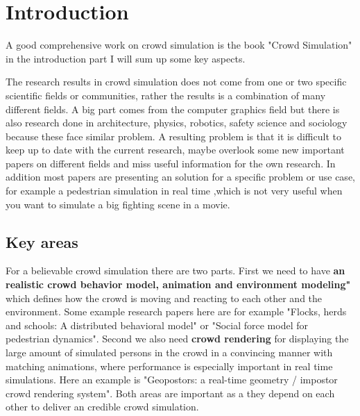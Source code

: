 \documentclass[sigconf]{acmart}
\begin{document}
\section{Introduction}

A good comprehensive work on crowd simulation is the book "Crowd Simulation" \cite{thalmann_crowd_2013} in the introduction part I will sum up some key aspects. 

The research results in crowd simulation does not come from one or two specific scientific fields or communities, rather the results is a combination of many different fields. A big part comes from the computer graphics field but there is also research done in architecture, physics, robotics, safety science and sociology because these face similar problem. A resulting problem is that it is difficult to keep up to date with the current research, maybe overlook some new important papers on different fields and miss useful information for the own research. In addition most papers are presenting an solution for a specific problem or use case, for example a pedestrian simulation in real time \cite{karamouzas_predictive_2009},which is not very useful when you want to simulate a big fighting scene in a movie.

\subsection{Key areas}
\label{chap:key_areas}
For a believable crowd simulation there are two parts. First we need to have \textbf{an realistic crowd behavior model, animation and environment modeling"} which defines how the crowd is moving and reacting to each other and the environment. Some example research papers here are for example "Flocks, herds and schools: A distributed behavioral model"\cite{reynolds_flocks_1987} or "Social force model for pedestrian dynamics"\cite{helbing_social_1995}. Second we also need \textbf{crowd rendering} for displaying the large amount of simulated persons in the crowd in a convincing manner with matching animations, where performance is especially important in real time simulations. Here an example is "Geopostors: a real-time geometry / impostor crowd rendering system"\cite{lee_crowd_2018}. Both areas are important as a they depend on each other to deliver an credible crowd simulation.
\end{document}
